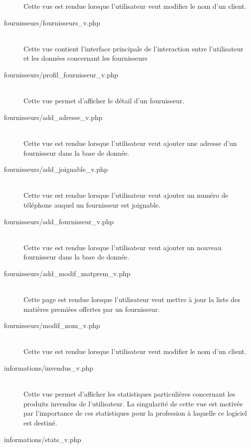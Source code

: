 \begin{description}
                Cette vue est rendue lorsque l'utilisateur veut modifier le
                nom d'un client.
            \item[fournisseurs/fournisseurs\_v.php]\hfill \\  
                Cette vue contient l'interface principale de l'interaction
                entre l'utilisateur et les données concernant les fournisseurs
            \item[fournisseurs/profil\_fournisseur\_v.php]\hfill \\
                Cette vue permet d'afficher le détail d'un fournisseur.
            \item[fournisseurs/add\_adresse\_v.php]\hfill \\      
                Cette vue est rendue lorsque l'utilisateur veut ajouter une
                adresse d'un fournisseur dans la base de donnée.
            \item[fournisseurs/add\_joignable\_v.php]\hfill \\      
                Cette vue est rendue lorsque l'utilisateur veut ajouter un
                numéro de téléphone auquel un fournisseur est joignable.
            \item[fournisseurs/add\_fournisseur\_v.php]\hfill \\  
                Cette vue est rendue lorsque l'utilisateur veut ajouter un
                nouveau fournisseur dans la base de donnée.
            \item[fournisseurs/add\_modif\_matprem\_v.php]\hfill \\  
                Cette page est rendue lorsque l'utilisateur veut mettre à
                jour la liste des matières premièes offertes par un
                fournisseur.
            \item[fournisseurs/modif\_nom\_v.php]\hfill \\
                Cette vue est rendue lorsque l'utilisateur veut modifier le
                nom d'un client.
            \item[informations/invendus\_v.php]\hfill \\
                Cette vue permet d'afficher les statistiques particulières
                concernant les produits invendus de l'utilisateur. La
                singularité de cette vue est motivée par l'importance de ces
                statistiques pour la profession à laquelle ce logiciel est
                destiné.
            \item[informations/stats\_v.php]\hfill \\

\end{description}
